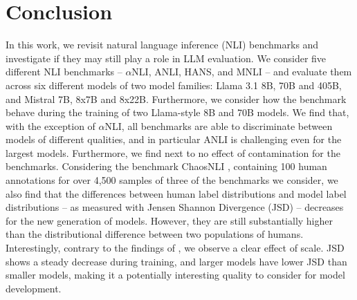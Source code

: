 \section{Conclusion}

In this work, we revisit natural language inference (NLI) benchmarks and investigate if they may still play a role in LLM evaluation.
We consider five different NLI benchmarks -- $\alpha$NLI, ANLI, HANS, and MNLI -- and evaluate them across six different models of two model families: Llama 3.1 8B, 70B and 405B, and Mistral 7B, 8x7B and 8x22B.
Furthermore, we consider how the benchmark behave during the training of two Llama-style 8B and 70B models.
We find that, with the exception of $\alpha$NLI, all benchmarks are able to discriminate between models of different qualities, and in particular ANLI is challenging even for the largest models.
Furthermore, we find next to no effect of contamination for the benchmarks.
Considering the benchmark ChaosNLI \citep{nie-etal-2020-learn}, containing 100 human annotations for over 4,500 samples of three of the benchmarks we consider, we also find that the differences between human label distributions and model label distributions -- as measured with Jensen Shannon Divergence (JSD) -- 
decreases for the new generation of models.
However, they are still substantially higher than the distributional difference between two populations of humans. 
Interestingly, contrary to the findings of \citet{nie-etal-2020-learn}, we observe a clear effect of scale.
JSD shows a steady decrease during training, and larger models have lower JSD than smaller models, making it a potentially interesting quality to consider for model development.
